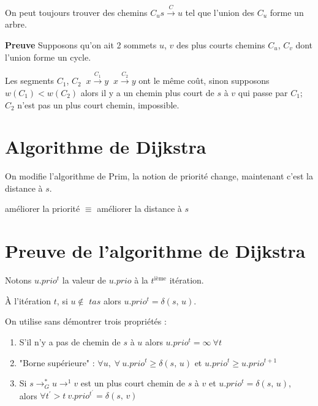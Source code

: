 \begin{proposition}
On peut toujours trouver des chemins $C_{u} s \overset{C}{\longrightarrow} u$ tel que l'union des $C_{u}$ forme un arbre.
\end{proposition}

\textbf{\sffamily\small Preuve}
Supposons qu'on ait 2 sommets $u$, $v$ des plus courts chemins $C_{u}$, $C_{v}$ dont l'union forme un cycle.

Les segments $C_{1}$, $C_{2}$ $\ x \overset{C_{1}}{\longrightarrow} y$ $\ x \overset{C_{2}}{\longrightarrow} y$ ont le même coût, sinon supposons $w(C_{1}) < w(C_{2})$ alors il y a un chemin plus court de $s$ à $v$ qui passe par $C_{1}$; $C_{2}$ n'est pas un plus court chemin, impossible.

\section{Algorithme de Dijkstra}

On modifie l'algorithme de Prim, la notion de priorité change, maintenant c'est la distance à $s$.

améliorer la priorité $\equiv$ améliorer la distance à $s$



\section{Preuve de l'algorithme de Dijkstra}

\begin{definition}
Notons $u.prio^{t}$ la valeur de $u.prio$ à la $t^{\text{ième}}$ itération.
\end{definition}

\begin{theorem}
À l'itération $t$, si $u \notin$ $tas$ alors $u.prio^{t} = \delta(s,\, u)$.
\end{theorem}

On utilise sans démontrer trois propriétés :

\begin{enumerate}[label=(P\arabic*)]
\item S'il n'y a pas de chemin de $s$ à $u$ alors $u.prio^{t} = \infty \ \forall t$
\item "Borne supérieure" : $\forall u,\; \forall \ u.prio^{t} \geq \delta(s,\, u)$ et $u.prio^{t} \geq u.prio^{t+1}$
\item Si $s \longrightarrow_{G}^{\ast} u \longrightarrow^{1} v$ est un plus court chemin de $s$ à $v$ et $u.prio^{t} = \delta(s,\, u)$,\\ alors $\forall t^{\prime} > t \ v.prio^{t^{\prime}} = \delta(s,\, v)$
\end{enumerate}

